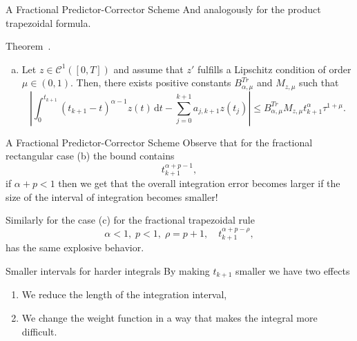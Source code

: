 \documentclass[aspectratio=169,xcolor=dvipsnames]{beamer}
\begin{document}
\begin{frame}{A Fractional Predictor-Corrector Scheme}
And analogously for the product trapezoidal formula.
\begin{alertblock}{Theorem~\parencite[Theorem 2.5]{FractionalAdamsMethodsAnalysis}.}
\begin{enumerate}[(a)]
\item Let $z \in \mathcal{C}^{1}([0,T])$ and assume that $z'$ fulfills a Lipschitz condition of order $\mu \in (0,1)$. Then, there exists positive constants $B_{\alpha,\mu}^{Tr}$ and $M_{z,\mu}$ such that\vspace{-0.5em}
\[
\left| \int_{0}^{t_{k+1}} (t_{k+1}-t)^{\alpha-1}z(t)\,\textrm{d}t - \sum_{j=0}^{k+1} a_{j,k+1}z(t_j) \right| \leq B_{\alpha,\mu}^{Tr} M_{z,\mu} t_{k+1}^\alpha \tau^{1+\mu}.
\] 
\end{enumerate}
\end{alertblock}
\end{frame}

\begin{frame}{A Fractional Predictor-Corrector Scheme}
Observe that for the fractional rectangular case \alert{(b)} the bound contains 
\[
t_{k+1}^{\alpha +p -1},
\]
if $\alpha+p<1$ then we get that the overall integration error becomes larger if the size
of the interval of integration becomes smaller!

Similarly for the case \alert{(c)} for the fractional trapezoidal rule
\[
\alpha < 1, \; p < 1, \; \rho = p + 1, \quad t_{k+1}^{\alpha+p-\rho},
\] 
has the same explosive behavior.

\begin{exampleblock}{Smaller intervals for harder integrals}
By making $t_{k+1}$ smaller we have two effects
\begin{enumerate}
	\item We reduce the length of the integration interval,
	\item We change the weight function in a way that makes the integral more difficult.
\end{enumerate}
\end{exampleblock}

\end{frame}
\end{document}
